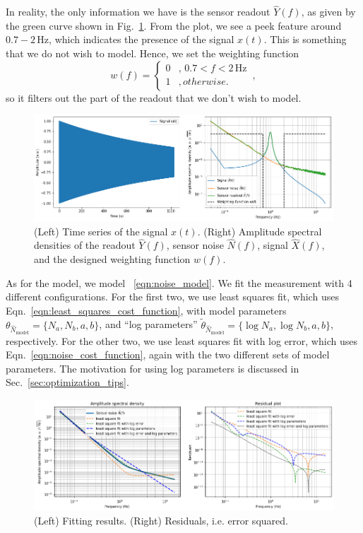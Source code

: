In reality, the only information we have is the sensor readout $\hat{Y}(f)$, as given by the green curve shown in Fig.~\ref{fig:tutorialsnoisespectrummodelingwithoptimization10}.
From the plot, we see a peek feature around $0.7 - 2\,\mathrm{Hz}$, which indicates the presence of the signal $x(t)$.
This is something that we do not wish to model.
Hence, we set the weighting function
\begin{equation}
	w(f)=
	\begin{cases}
		0 & ,\,0.7<f<2\,\mathrm{Hz}\\
		1 & , otherwise.
	\end{cases}
	\,,
\end{equation}
so it filters out the part of the readout that we don't wish to model.
\begin{figure}[!h]
	\centering
	\includegraphics[width=1\linewidth]{figures/tutorials_noise_spectrum_modeling_with_optimization_1_0}
	\caption{(Left) Time series of the signal $x(t)$. (Right) Amplitude spectral densities of the readout $\hat{Y}(f)$, sensor noise $\hat{N}(f)$, signal $\hat{X}(f)$, and the designed weighting function $w(f)$.}
	\label{fig:tutorialsnoisespectrummodelingwithoptimization10}
\end{figure}

As for the model, we model ~\eqref{eqn:noise_model}.
We fit the measurement with 4 different configurations.
For the first two, we use least squares fit, which uses Eqn.~\eqref{eqn:least_squares_cost_function}, with model parameters $\theta_{\hat{N}_\mathrm{model}}=\{N_a, N_b, a, b\}$, and ``log parameters'' $\tilde{\theta}_{\hat{N}_\mathrm{model}}=\{\log N_a, \log N_b, a, b\}$, respectively.
For the other two, we use least squares fit with log error, which uses Eqn.~\eqref{eqn:noise_cost_function}, again with the two different sets of model parameters.
The motivation for using log parameters is discussed in Sec.~\ref{sec:optimization_tips}.


\begin{figure}[!h]
	\centering
	\includegraphics[width=1\linewidth]{figures/tutorials_noise_spectrum_modeling_with_optimization_8_0}
	\caption{(Left) Fitting results. (Right) Residuals, i.e. error squared.}
	\label{fig:tutorialsnoisespectrummodelingwithoptimization80}
\end{figure}

